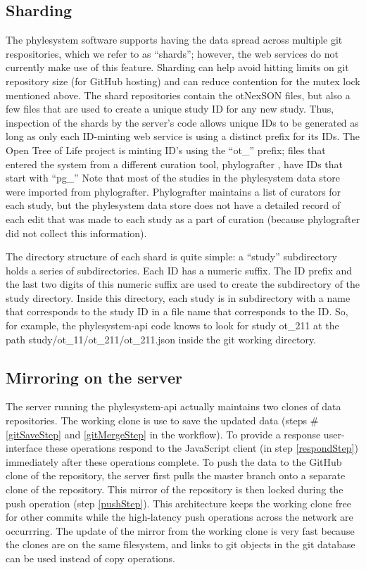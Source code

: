 \documentclass{bioinfo}
\newcommand{\ps}{phylesystem\xspace}
\newcommand{\otol}{Open Tree of Life\xspace}
\newcommand{\nexson}{otNexSON\xspace}
\newcommand{\js}{JavaScript\xspace}
\begin{document}
\begin{methods}
\subsection{Sharding}
The \ps software supports having the data spread across multiple git respositories, which
    we refer to as ``shards''; however, the web services do not currently make use of this feature.
Sharding can help avoid hitting limits on git repository size (for GitHub hosting) and can 
    reduce contention for the mutex lock mentioned above.
The shard repositories contain the \nexson files, but also a few files that are used to 
    create a unique study ID for any new study.
Thus, inspection of the shards by the server's code allows unique IDs to be generated as long as 
    only each ID-minting web service is using a distinct prefix for its IDs.
The \otol project is minting ID's using the ``ot\_'' prefix;
    files that entered the system from a different curation tool, phylografter \citep{Phylografter},
    have IDs that start with ``pg\_''
Note that most of the studies in the \ps data store were imported from phylografter.
Phylografter maintains a list of curators for each study, but the \ps data store does not
    have a detailed record of each edit that was made to each study as a part of 
    curation (because phylografter did not collect this information).

The directory structure of each shard is quite simple: a ``study'' subdirectory holds 
a series of subdirectories.
Each ID has a numeric suffix.
The ID prefix and the last two digits of this numeric suffix are used to create the 
    subdirectory of the study directory.
Inside this directory, each study is in subdirectory with a name that corresponds to the study ID
    in a file name that corresponds to the ID.
So, for example, the \ps-api code knows to look for study ot\_211 at the path
    study/ot\_11/ot\_211/ot\_211.json inside the git working directory.

\subsection{Mirroring on the server}
The server running the \ps-api actually maintains two clones of data repositories.
The working clone is use to save the updated data (steps \#\ref{gitSaveStep} and \ref{gitMergeStep}  in the workflow).
To provide a response user-interface these operations respond to the \js client (in step \ref{respondStep}) immediately
    after these operations complete.
To push the data to the GitHub clone of the repository, the server first pulls the master branch onto a separate
    clone of the repository.
This mirror of the repository is then locked during the push operation (step \ref{pushStep}).
This architecture keeps the working clone free for other commits while the high-latency push operations across the
    network are occurrring.
The update of the mirror from the working clone is very fast because the clones are on the same filesystem, and 
    links to git objects in the git database can be used instead of copy operations.


\end{methods}
\end{document}
